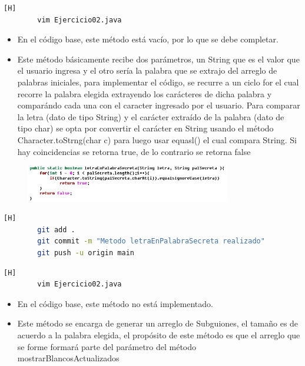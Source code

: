 \documentclass{article}
\begin{document}
	\begin{lstlisting}[language=bash,caption={Completando el método letraEnPalabraSecreta }][H]
		vim Ejercicio02.java
	\end{lstlisting}
	\begin{itemize}	
		\item En el código base, este método está vacío, por lo que se debe completar. 
		\item Este método básicamente recibe dos parámetros, un String que es el valor que el usuario ingresa y el otro sería la palabra que se extrajo del arreglo de palabras iniciales, para implementar el código, se recurre a un ciclo for el cual recorre la palabra elegida extrayendo los carácteres de dicha palabra y comparándo cada una con el caracter ingresado por el usuario. Para comparar la letra (dato de tipo String) y el carácter extraído de la palabra (dato de tipo char) se opta por convertir el carácter en String usando el método Character.toStrng(char c) para luego usar equasl() el cual compara String. Si hay coincidencias se retorna true, de lo contrario se retorna false
	\end{itemize}
	\begin{figure}[H]
		\centering
		\includegraphics[width=0.8\textwidth,keepaspectratio]{img/letraEnPalabraSecreta.jpg}
	\end{figure}
	
	
	
	\begin{lstlisting}[language=bash,caption={Commit: Subiendo al repositorio Ejercicio02.java}][H]
		git add .
		git commit -m "Metodo letraEnPalabraSecreta realizado"			
		git push -u origin main
	\end{lstlisting}	
	
	
	
	\begin{lstlisting}[language=bash,caption={Creando un nuevo método que genera un arreglo de Strings formado por Subguiones}][H]
		vim Ejercicio02.java
	\end{lstlisting}
	
	\begin{itemize}	
		\item En el código base, este método no está implementado. 
		\item Este método se encarga de generar un arreglo de Subguiones, el tamaño es de acuerdo a la palabra elegida, el propósito de este método es que el arreglo que se forme formará parte del parámetro del método mostrarBlancosActualizados
	\end{itemize}
	
\end{document}

